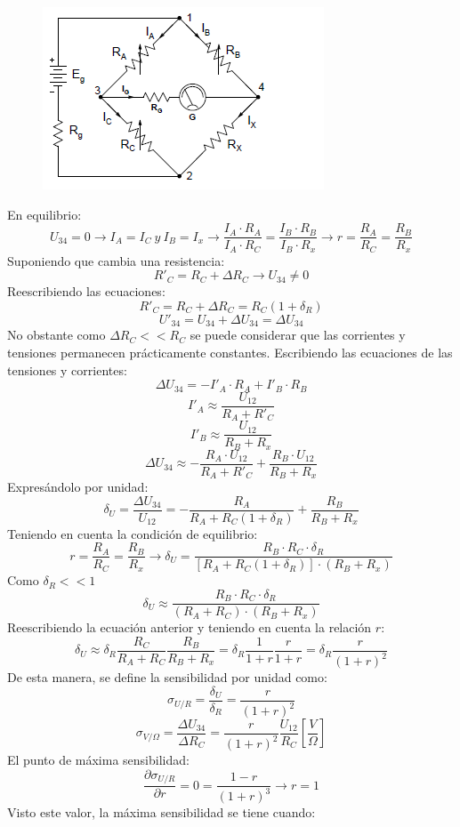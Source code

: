 \begin{figure}[H]
	\centering
	\includegraphics[width=0.5\linewidth]{ImagenesTema4/17}

	\label{fig:17}
\end{figure}
En equilibrio:
\[U_{34}=0\rightarrow I_A=I_C \ y \ I_B=I_x \rightarrow \frac{I_A \cdot R_A}{I_A \cdot R_C}=\frac{I_B \cdot R_B}{I_B \cdot R_x}\rightarrow r=\frac{R_A}{ R_C}=\frac{R_B}{R_x}\]
Suponiendo que cambia una resistencia:
\[R'_C=R_C+\Delta R_C \rightarrow U_{34}\ne 0\]
Reescribiendo las ecuaciones:
\[R'_C=R_C+\Delta R_C=R_C(1+\delta_R)\]
\[U'_{34}=U_{34}+\Delta U_{34}=\Delta U_{34}\]
No obstante como $\Delta R_C << R_C$ se puede considerar que las corrientes y tensiones permanecen prácticamente constantes. Escribiendo las ecuaciones de las tensiones y corrientes:
\[\Delta U_{34}=-I'_A\cdot R_A+I'_B\cdot R_B\]
\[I'_A \approx \frac{U_{12}}{R_A+R'_C}\]
\[I'_B\approx \frac{U_{12}}{R_B+R_x}\]
\[\Delta U_{34}\approx - \frac{R_A\cdot U_{12}}{R_A+R'_C}+\frac{R_B\cdot U_{12}}{R_B+R_x}\]
Expresándolo por unidad:
\[\delta_U=\frac{\Delta U_{34}}{U_{12}}= - \frac{R_A}{R_A+R_C(1+\delta_R)}+\frac{R_B}{R_B+R_x}\] 
Teniendo en cuenta la condición de equilibrio:
\[r=\frac{R_A}{ R_C}=\frac{R_B}{R_x}\rightarrow
\delta_U=  \frac{R_B \cdot R_C \cdot \delta_R}
{\left[R_A+R_C(1+\delta_R)\right]\cdot \left(R_B+R_x\right)}
\]
Como $\delta_R << 1 $
\[\delta_U\approx  \frac{R_B \cdot R_C \cdot \delta_R}
{\left(R_A+R_C\right)\cdot \left(R_B+R_x\right)}\]
Reescribiendo la ecuación anterior y teniendo en cuenta la relación $r$:
\[\delta_U\approx \delta_R \frac{R_C}{R_A+R_C}  \frac{R_B}{R_B+R_x}=\delta_R \frac{1}{1+r}\frac{r}{1+r}=\delta_R \frac{r}{\left(1+r\right)^2}\]
De esta manera, se define la sensibilidad por unidad como:
\[\sigma_{U/R}=\frac{\delta_U}{\delta_R}=\frac{r}{\left(1+r\right)^2}\]
\[\sigma_{V/\Omega}=\frac{\Delta U_{34}}{\Delta R_C}=\frac{r}{\left(1+r\right)^2}\frac{U_{12}}{R_C} \left[\frac{V}{\Omega}\right]\]
El punto de máxima sensibilidad:
\[\frac{\partial \sigma_{U/R}}{\partial r}=0=\frac{1-r}{\left(1+r\right)^3}\rightarrow r=1\]
Visto este valor, la máxima sensibilidad se tiene cuando:
